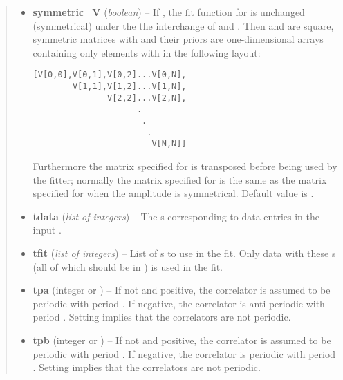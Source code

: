 \documentclass[letterpaper,10pt,english]{sphinxmanual}
\begin{document}
\begin{fulllineitems}
\begin{quote}
\begin{description}
\begin{itemize}
\item {} 
\textbf{symmetric\_V} (\emph{boolean}) -- 
If , the fit function for  is 
unchanged (symmetrical) under the the interchange of  and
. Then  and  are square, symmetric matrices
with  and their priors are one-dimensional arrays
containing only elements  with  in the following
layout:

\begin{Verbatim}[commandchars=\\\{\}]
[V[0,0],V[0,1],V[0,2]...V[0,N],
        V[1,1],V[1,2]...V[1,N],
               V[2,2]...V[2,N],
                     .
                      .
                       .
                        V[N,N]]
\end{Verbatim}

Furthermore the matrix specified for  is transposed before
being used by the fitter; normally the matrix specified for 
is the same as the matrix specified for  when the amplitude
is symmetrical. Default value is .


\item {} 
\textbf{tdata} (\emph{list of integers}) -- The s corresponding to data entries in the input
.

\item {} 
\textbf{tfit} (\emph{list of integers}) -- List of s to use in the fit. Only data with these
s (all of which should be in ) is used in the fit.

\item {} 
\textbf{tpa} (integer or ) -- If not  and positive, the  correlator is 
assumed to be periodic with period . If negative, the
correlator is anti-periodic with period . Setting
 implies that the correlators are not periodic.

\item {} 
\textbf{tpb} (integer or ) -- If not  and positive, the  correlator is 
assumed to be periodic with period . If negative, the
correlator is periodic with period . Setting 
implies that the correlators are not periodic.

\end{itemize}


\end{description}
\end{quote}
\end{fulllineitems}
\end{document}
